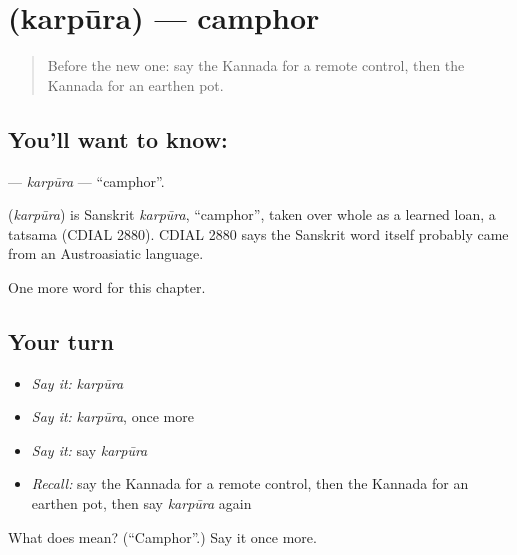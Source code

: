 \section[\texorpdfstring{\kn{ಕರ್ಪೂರ} (karpūra)}{ಕರ್ಪೂರ (karpūra)}]{ (karpūra) — camphor}

\label{lesson:KA-C266-karpura}



\begin{quote}
Before the new one: say the Kannada for a remote control, then the Kannada for an earthen pot.
\end{quote}

\subsection*{You'll want to know: }
\textbf{} — \emph{karpūra} — \textquotedblleft{}camphor\textquotedblright{}.

\begin{cousinweb}
\textbf{} (\emph{karpūra}) is Sanskrit \emph{karpūra}, \textquotedblleft{}camphor\textquotedblright{}, taken over whole as a learned loan, a tatsama (CDIAL 2880). CDIAL 2880 says the Sanskrit word itself probably came from an Austroasiatic language.
\end{cousinweb}

\begin{grammarlens}[title={What you've built}]
One more word for this chapter.
\end{grammarlens}

\subsection*{Your turn}
\begin{itemize}
\raggedright
  \item \emph{Say it:} \emph{karpūra}
  \item \emph{Say it:} \emph{karpūra}, once more
  \item \emph{Say it:} say \emph{karpūra}
  \item \emph{Recall:} say the Kannada for a remote control, then the Kannada for an earthen pot, then say \emph{karpūra} again
\end{itemize}

\begin{tcolorbox}[breakable,colback=teal!4,colframe=teal!35!black,title={Before you move on}]
What does  mean? (\textquotedblleft{}Camphor\textquotedblright{}.) Say it once more.
\end{tcolorbox}
